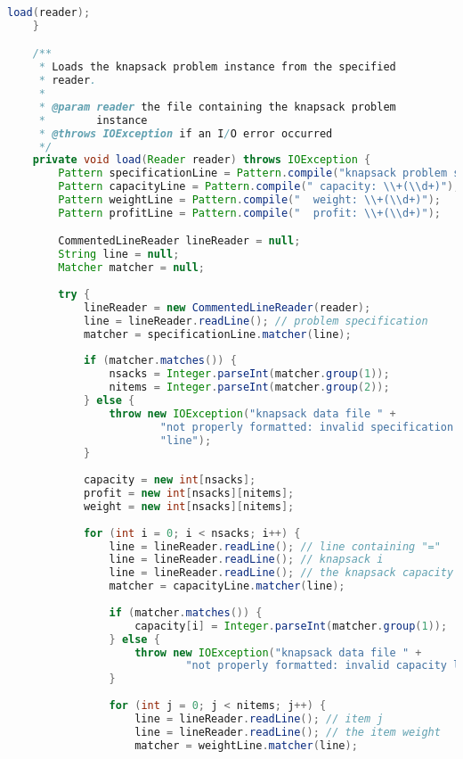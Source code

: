 \begin{lstlisting}[language=Java]
		load(reader);
	}

	/**
	 * Loads the knapsack problem instance from the specified
	 * reader.
	 * 
	 * @param reader the file containing the knapsack problem
	 *        instance
	 * @throws IOException if an I/O error occurred
	 */
	private void load(Reader reader) throws IOException {
		Pattern specificationLine = Pattern.compile("knapsack problem specification \\((\\d+) knapsacks, (\\d+) items\\)");
		Pattern capacityLine = Pattern.compile(" capacity: \\+(\\d+)");
		Pattern weightLine = Pattern.compile("  weight: \\+(\\d+)");
		Pattern profitLine = Pattern.compile("  profit: \\+(\\d+)");

		CommentedLineReader lineReader = null;
		String line = null;
		Matcher matcher = null;
		
		try {
			lineReader = new CommentedLineReader(reader);
			line = lineReader.readLine(); // problem specification
			matcher = specificationLine.matcher(line);
			
			if (matcher.matches()) {
				nsacks = Integer.parseInt(matcher.group(1));
				nitems = Integer.parseInt(matcher.group(2));
			} else {
				throw new IOException("knapsack data file " +
						"not properly formatted: invalid specification " +
						"line");
			}
			
			capacity = new int[nsacks];
			profit = new int[nsacks][nitems];
			weight = new int[nsacks][nitems];
	
			for (int i = 0; i < nsacks; i++) {
				line = lineReader.readLine(); // line containing "="
				line = lineReader.readLine(); // knapsack i
				line = lineReader.readLine(); // the knapsack capacity
				matcher = capacityLine.matcher(line);
				
				if (matcher.matches()) {
					capacity[i] = Integer.parseInt(matcher.group(1));
				} else {
					throw new IOException("knapsack data file " +
							"not properly formatted: invalid capacity line");
				}
	
				for (int j = 0; j < nitems; j++) {
					line = lineReader.readLine(); // item j
					line = lineReader.readLine(); // the item weight
					matcher = weightLine.matcher(line);
					

\end{lstlisting}
